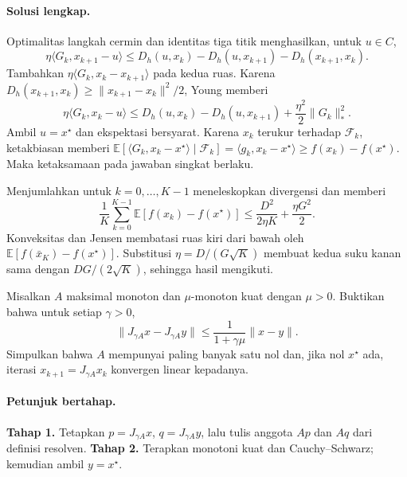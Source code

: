\paragraph{Solusi lengkap.}
\label{orig03:final:solution:0005}
Optimalitas langkah cermin dan identitas tiga titik menghasilkan, untuk
$u\in C$,
\[
 \eta\langle G_k,x_{k+1}-u\rangle
 \le D_h(u,x_k)-D_h(u,x_{k+1})-D_h(x_{k+1},x_k).
\]
Tambahkan $\eta\langle G_k,x_k-x_{k+1}\rangle$ pada kedua ruas. Karena
$D_h(x_{k+1},x_k)\ge\lVert x_{k+1}-x_k\rVert^2/2$, Young memberi
\[
 \eta\langle G_k,x_k-u\rangle
 \le D_h(u,x_k)-D_h(u,x_{k+1})
 +\frac{\eta^2}{2}\lVert G_k\rVert_*^2.
\]
Ambil $u=x^\star$ dan ekspektasi bersyarat. Karena $x_k$ terukur terhadap
$\mathcal F_k$, ketakbiasan memberi
$\mathbb E[\langle G_k,x_k-x^\star\rangle\mid\mathcal F_k]
=\langle g_k,x_k-x^\star\rangle\ge f(x_k)-f(x^\star)$.
Maka ketaksamaan pada jawaban singkat berlaku.

Menjumlahkan untuk $k=0,\ldots,K-1$ meneleskopkan divergensi dan memberi
\[
 \frac1K\sum_{k=0}^{K-1}\mathbb E[f(x_k)-f(x^\star)]
 \le\frac{D^2}{2\eta K}+\frac{\eta G^2}{2}.
\]
Konveksitas dan Jensen membatasi ruas kiri dari bawah oleh
$\mathbb E[f(\bar x_K)-f(x^\star)]$. Substitusi
$\eta=D/(G\sqrt K)$ membuat kedua suku kanan sama dengan
$DG/(2\sqrt K)$, sehingga hasil mengikuti.

\begin{exercise}
\label{orig03:final:exercise:0006}
Misalkan $A$ maksimal monoton dan $\mu$-monoton kuat dengan $\mu>0$.
Buktikan bahwa untuk setiap $\gamma>0$,
\[
 \lVert J_{\gamma A}x-J_{\gamma A}y\rVert
 \le\frac1{1+\gamma\mu}\lVert x-y\rVert.
\]
Simpulkan bahwa $A$ mempunyai paling banyak satu nol dan, jika nol
$x^\star$ ada, iterasi $x_{k+1}=J_{\gamma A}x_k$ konvergen linear kepadanya.
\end{exercise}

\paragraph{Petunjuk bertahap.}
\label{orig03:final:hint:0006}
\textbf{Tahap 1.} Tetapkan $p=J_{\gamma A}x$, $q=J_{\gamma A}y$, lalu tulis
anggota $Ap$ dan $Aq$ dari definisi resolven.
\textbf{Tahap 2.} Terapkan monotoni kuat dan Cauchy--Schwarz; kemudian ambil
$y=x^\star$.

